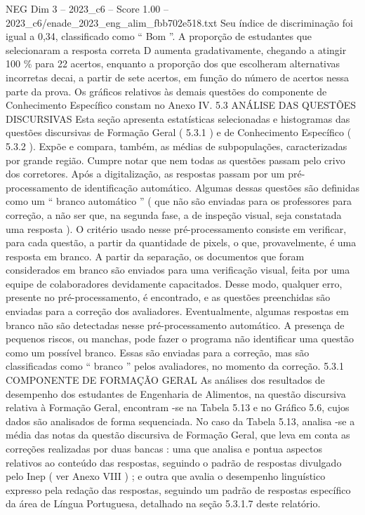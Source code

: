 \begin{textsample}{NEG Dim 3 – 2023\_c6 – Score 1.00 – 2023\_c6/enade\_2023\_eng\_alim\_fbb702e518.txt}
Seu índice de discriminação foi igual a 0,34, classificado como “ Bom ”.
A proporção de estudantes que selecionaram a resposta correta D aumenta gradativamente, chegando a atingir 100 \% para 22 acertos, enquanto a proporção dos que escolheram alternativas incorretas decai, a partir de sete acertos, em função do número de acertos nessa parte da prova.
Os gráficos relativos às demais questões do componente de Conhecimento Específico constam no Anexo IV. 5.3 ANÁLISE DAS QUESTÕES DISCURSIVAS Esta seção apresenta estatísticas selecionadas e histogramas das questões discursivas de Formação Geral ( 5.3.1 ) e de Conhecimento Específico ( 5.3.2 ).
Expõe e compara, também, as médias de subpopulações, caracterizadas por grande região.
Cumpre notar que nem todas as questões passam pelo crivo dos corretores.
Após a digitalização, as respostas passam por um pré-processamento de identificação automático.
Algumas dessas questões são definidas como um “ branco automático ” ( que não são enviadas para os professores para correção, a não ser que, na segunda fase, a de inspeção visual, seja constatada uma resposta ).
O critério usado nesse pré-processamento consiste em verificar, para cada questão, a partir da quantidade de pixels, o que, provavelmente, é uma resposta em branco.
A partir da separação, os documentos que foram considerados em branco são enviados para uma verificação visual, feita por uma equipe de colaboradores devidamente capacitados.
Desse modo, qualquer erro, presente no pré-processamento, é encontrado, e as questões preenchidas são enviadas para a correção dos avaliadores.
Eventualmente, algumas respostas em branco não são detectadas nesse pré-processamento automático.
A presença de pequenos riscos, ou manchas, pode fazer o programa não identificar uma questão como um possível branco.
Essas são enviadas para a correção, mas são classificadas como “ branco ” pelos avaliadores, no momento da correção. 5.3.1 COMPONENTE DE FORMAÇÃO GERAL As análises dos resultados de desempenho dos estudantes de Engenharia de Alimentos, na questão discursiva relativa à Formação Geral, encontram -se na Tabela 5.13 e no Gráfico 5.6, cujos dados são analisados de forma sequenciada.
No caso da Tabela 5.13, analisa -se a média das notas da questão discursiva de Formação Geral, que leva em conta as correções realizadas por duas bancas : uma que analisa e pontua aspectos relativos ao conteúdo das respostas, seguindo o padrão de respostas divulgado pelo Inep ( ver Anexo VIII ) ; e outra que avalia o desempenho linguístico expresso pela redação das respostas, seguindo um padrão de respostas específico da área de Língua Portuguesa, detalhado na seção 5.3.1.7 deste relatório.

\end{textsample}
